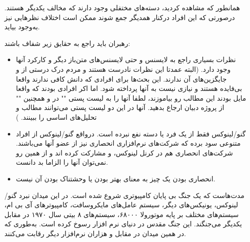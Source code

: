 همانطور که مشاهده کردید، دسته‌های مختفلی وجود دارند که مخالف یکدیگر هستند.
درصورتی که این افراد درکنار همدیگر جمع شوند ممکن است اختلاف نظرهایی نیز به‌وجود بیاید.

رهبران باید راجع به حقایق زیر شفاف باشند:

\begin{itemize}
\item 
نظرات بسیاری راجع به لایسنس  و حتی لایسنس‌های متن‌باز دیگر و کارکرد آنها وجود دارد.
(البته عمدتا این نظرات نادرست هستند و مردم درک درستی از  و جایگزین‌های آن ندارند.
این بحث‌ها برای افرادی که دانش کافی ندارند واقعا بی‌فایده هستند و نیازی نیست به آنها پرداخته شود.
اما اکر افرادی بودند که واقعا مایل بودند این مطالب رو بیاموزند، لطفا آنها را به لیست پستی "" 
در  و همچنین "" از پروژه دبیان ارجاع بدهید. آنها در این دو لیست پستی
می‌توانند مطالب و تحلیل‌های اساسی را ببینند.
)

\item 
گنو/لینوکس فقط از یک فرد یا دسته نفع نبرده است. درواقع گنو/لینوکس از افراد متنوعی
سود برده که شرکت‌های نرم‌افزاری انحصاری نیز از عضو آنها می‌باشند. شرکت‌های انحصاری
هم در کرنل لینوکس،  و  مشارکت کرده اند و از همین رو نمی‌توان آنها
را الزاما بد دانست.

\item 
انحصاری بودن یک چیز به معنای بهتر بودن یا وحشتناک بودن آن نیست.
\end{itemize}

مدت‌هاست که یک جنگ بی پایان کامپیوتری شروع شده است. در این میدان نبرد
گنو/لینوکس، یونیکس‌های دیگر، سیستم عامل‌های مایکروسافت، کامپیوترهای آی بی ام،
سیستم‌های مختلف بر پایه موتورولا ۶۸۰۰۰، سیستم‌های ۸ بیتی سال ۱۹۷۰ در مقابل یکدیگر
می‌جنگند. این جنگ مقدس در دنیای نرم افزار رسوخ کرده است. به‌طوری که در
همین میدان  در مقابل  و هزاران نرم‌افزار دیگر رقابت می‌کنند.

